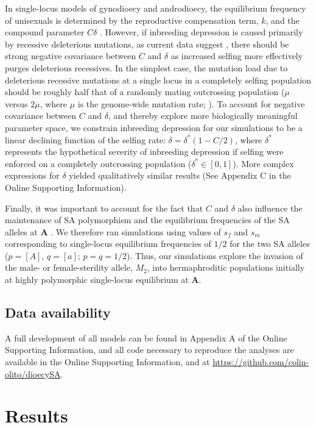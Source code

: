 \documentclass[9pt,twocolumn,twoside,lineno]{gsajnl}
\begin{document}
In single-locus models of gynodioecy and androdioecy, the equilibrium frequency of unisexuals is determined by the reproductive compensation term, $k$, and the compound parameter $C \delta$ \citep{Charlesworth1978a}. However, if inbreeding depression is caused primarily by recessive deleterious mutations, as current data suggest \citep{Charlesworth2009}, there should be strong negative covariance between $C$ and $\delta$ as increased selfing more effectively purges deleterious recessives. In the simplest case, the mutation load due to deleterious recessive mutations at a single locus in a completely selfing population should be roughly half that of a randomly mating outcrossing population ($\mu$ versus $2 \mu$, where $\mu$ is the genome-wide mutation rate; \citealt{OhtaCockerham1974}). To account for negative covariance between $C$ and $\delta$, and thereby explore more biologically meaningful parameter space, we constrain inbreeding depression for our simulations to be a linear declining function of the selfing rate: $\delta = \delta^\ast(1 - C/2)$, where $\delta^\ast$ represents the hypothetical severity of inbreeding depression if selfing were enforced on a completely outcrossing population ($\delta^\ast \in [0,1]$). More complex expressions for $\delta$ yielded qualitatively similar results (See Appendix C in the Online Supporting Information). 

Finally, it was important to account for the fact that $C$ and $\delta$ also influence the maintenance of SA polymorphism and the equilibrium frequencies of the SA alleles at $\mathbf{A}$ \citep{JordanConnallon2014,Olito2016}. We therefore ran simulations using values of $s_f$ and $s_m$ corresponding to single-locus equilibrium frequencies of $1/2$ for the two SA alleles ($p = [A]$, $q = [a]$; $p=q=1/2$). Thus, our simulations explore the invasion of the male- or female-sterility allele, $M_2$, into hermaphroditic populations initially at highly polymorphic single-locus equilibrium at $\mathbf{A}$.


\subsection{Data availability}
A full development of all models can be found in Appendix A of the Online Supporting Information, and all code necessary to reproduce the analyses are available in the Online Supporting Information, and at \url{https://github.com/colin-olito/dioecySA}.

\section{Results}
\end{document}
